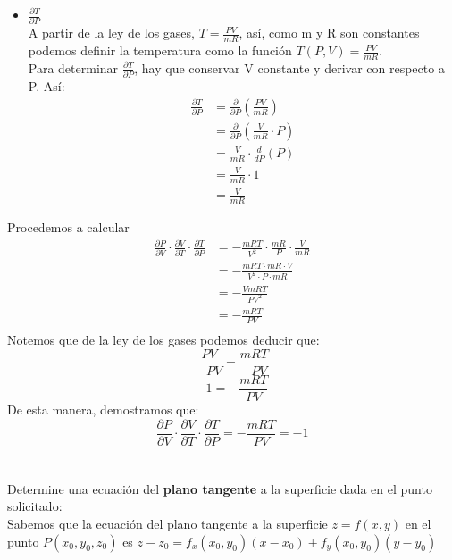 \documentclass[12pt]{article}
\begin{document}
\begin{itemize}[format=\textbf]
\begin{itemize}
 \item $\frac{\partial T}{\partial P}$\\
  A partir de la ley de los gases,  $T =\frac{PV}{mR}$, así, como m y R son constantes podemos definir la temperatura como la función $T(P,V) =\frac{PV}{mR}$.\\ Para determinar  $\frac{\partial T}{\partial P}$,  hay que conservar V constante y derivar con respecto a P. Así:
    \begin{align*}
     \frac{\partial T}{\partial P} &= \frac{\partial}{\partial P}\left(\frac{PV}{mR}\right) \\
      &= \frac{\partial}{\partial P}\left(\frac{V}{mR} \cdot P\right) \\
      &= \frac{V}{mR} \cdot  \frac{d}{d P}\left(P\right) \\
      &= \frac{V}{mR} \cdot 1  \\
      &= \frac{V}{mR}
  \end{align*}

\end{itemize}
Procedemos a calcular
 \begin{align*}
   \frac{\partial P}{\partial V} \cdot \frac{\partial V}{\partial T} \cdot \frac{\partial T}{\partial P} &=  -\frac{mRT}{V^2} \cdot \frac{mR}{P}  \cdot  \frac{V}{mR} \\
   &= - \frac{ mRT \cdot mR \cdot V}{V^2 \cdot P \cdot mR } \\
   &= - \frac{VmRT}{PV^2} \\
   &= - \frac{mRT}{PV} \\
  \end{align*}
Notemos que de la ley de los gases podemos deducir que:
\[
\frac{PV}{-PV} = \frac{mRT}{-PV}
\]
\[
-1 = -\frac{mRT}{PV}
\]
De esta manera, demostramos que:
\[
\frac{\partial P}{\partial V} \cdot \frac{\partial V}{\partial T} \cdot \frac{\partial T}{\partial P} =  - \frac{mRT}{PV} = -1
\]

\section{}

Determine una ecuación del \textbf{plano tangente} a la superficie dada en el punto solicitado: \\
Sabemos que la ecuación del plano tangente a la superficie $z = f(x,y)$ en el punto $P(x_0, y_0, z_0)$ es $z - z_0 = f_x(x_0, y_0)(x-x_0) + f_y(x_0, y_0)(y-y_0)$
\begin{itemize}[format=\textbf]


\end{itemize}
\end{itemize}
\end{document}
